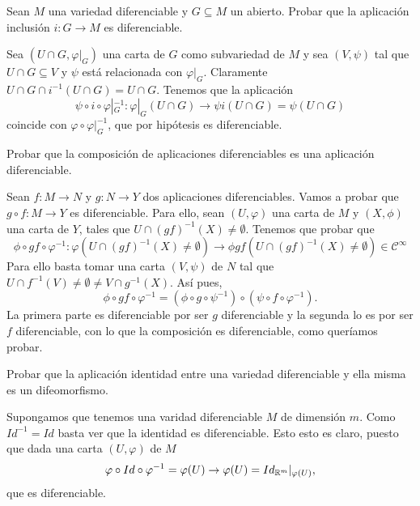 \documentclass[twoside]{article}
\begin{document}
\newpage

\begin{ejercicio}{2}
Sean $M$ una variedad diferenciable y $G \subseteq M$ un abierto. Probar que la
aplicación inclusión $i : G \to M$ es diferenciable.
\end{ejercicio}
\begin{solucion}
Sea $(U\cap G,\varphi|_G)$ una carta de $G$ como subvariedad de $M$ y sea $(V,\psi)$ tal que $U\cap G\subseteq V$ y $\psi$ está relacionada con $\varphi|_G$. Claramente $U\cap G\cap i^{-1}(U\cap G)=U\cap G$. Tenemos que la aplicación 
$$\psi\circ i\circ\varphi|_G^{-1}:\varphi|_G(U\cap G)\to \psi i(U\cap G)=\psi(U\cap G)$$
coincide con $\varphi\circ\varphi|_G^{-1}$, que por hipótesis es diferenciable.
\end{solucion}

\newpage

\begin{ejercicio}{3}
Probar que la composición de aplicaciones diferenciables es una aplicación
diferenciable.
\end{ejercicio}
\begin{solucion}
Sean $f:M\to N$ y $g:N\to Y$ dos aplicaciones diferenciables. Vamos a probar que $g\circ f:M\to Y$ es diferenciable. Para ello, sean $(U,\varphi)$ una carta de $M$ y $(X,\phi)$ una carta de $Y$, tales que $U\cap (gf)^{-1}(X)\neq\emptyset$. Tenemos que probar que
$$\phi\circ gf\circ \varphi^{-1}:\varphi(U\cap (gf)^{-1}(X)\neq\emptyset)\to \phi gf(U\cap (gf)^{-1}(X)\neq\emptyset)\in\mathcal{C}^\infty$$
Para ello basta tomar una carta $(V,\psi)$ de $N$ tal que $U\cap f^{-1}(V)\neq\emptyset\neq V\cap g^{-1}(X)$. Así pues,
$$\phi\circ gf\circ \varphi^{-1}=(\phi\circ g\circ\psi^{-1})\circ(\psi\circ f\circ \varphi^{-1}).$$
La primera parte es diferenciable por ser $g$ diferenciable y la segunda lo es por ser $f$ diferenciable, con lo que la composición es diferenciable, como queríamos probar.
\end{solucion}

\newpage

\begin{ejercicio}{4}
Probar que la aplicación identidad entre una variedad diferenciable y ella
misma es un difeomorfismo.
\end{ejercicio}
\begin{solucion}
Supongamos que tenemos una varidad diferenciable $M$ de dimensión $m$. Como $Id^{-1}=Id$ basta ver que la identidad es diferenciable. Esto esto es claro, puesto que dada una carta $(U,\varphi)$ de $M$ 
$$\varphi\circ Id\circ\varphi^{-1}=\varphi(U)\to\varphi(U)=Id_{\mathbb{R}^m}|_{\varphi(U)},$$
que es diferenciable.
\end{solucion}
\end{document}

